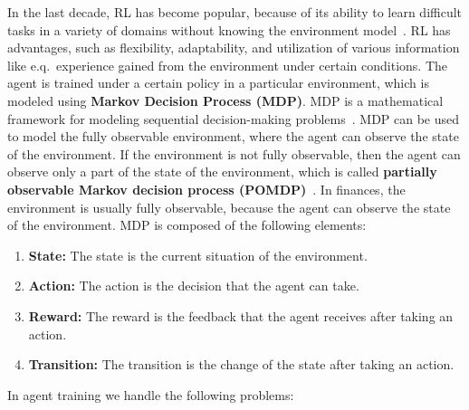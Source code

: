 In the last decade, RL has become popular, because of its ability to learn difficult tasks in a variety of domains without knowing the environment model~\cite{sutton2018reinforcement}.
RL has advantages, such as flexibility, adaptability, and utilization of various information like e.q.\ experience gained from the environment under certain conditions.
The agent is trained under a certain policy in a particular environment, which is modeled using \textbf{Markov Decision Process (MDP)}.
MDP is a mathematical framework for modeling sequential decision-making problems~\cite{rao2022foundations}.
MDP can be used to model the fully observable environment, where the agent can observe the state of the environment.
If the environment is not fully observable, then the agent can observe only a part of the state of the environment, which is called \textbf{partially observable Markov decision process (POMDP)}~\cite{sutton2018reinforcement}.
In finances, the environment is usually fully observable, because the agent can observe the state of the environment.
MDP is composed of the following elements:
\begin{enumerate}[label=\textbf{\arabic*}., ref=\arabic*]
    \item \textbf{State:} The state is the current situation of the environment.
    \item \textbf{Action:} The action is the decision that the agent can take.
    \item \textbf{Reward:} The reward is the feedback that the agent receives after taking an action.
    \item \textbf{Transition:} The transition is the change of the state after taking an action.
\end{enumerate}
In agent training we handle the following problems:
